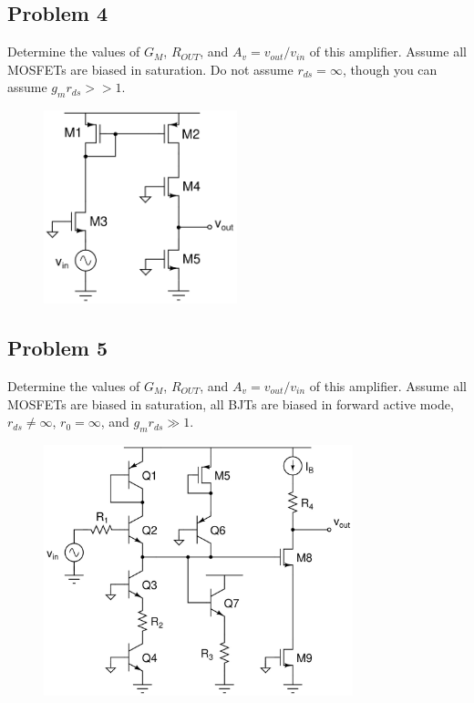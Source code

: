 \documentclass{article}
\begin{document}
\subsection*{Problem 4}
Determine the values of $G_M$, $R_{OUT}$, and $A_v = v_{out}/v_{in}$ of this amplifier.  Assume all MOSFETs are biased in saturation.  Do not assume $r_{ds} = \infty$, though you can assume $g_mr_{ds} >> 1$.
\begin{figure}[!h]
\begin{center}
    \includegraphics[width=0.5\textwidth]{figures/cc_amp_4.png}
\end{center}
\end{figure}
\newpage
\subsection*{Problem 5}
Determine the values of $G_M$, $R_{OUT}$, and $A_v = v_{out}/v_{in}$ of this amplifier.  Assume all MOSFETs are biased in saturation, all BJTs are biased in forward active mode, $r_{ds} \ne \infty$, $r_0 = \infty$, and $g_mr_{ds} \gg 1$. 
\begin{figure}[!h]
\begin{center}
    \includegraphics[width=0.8\textwidth]{figures/cc_amp5.jpg}
\end{center}
\end{figure}
\newpage
\end{document}

